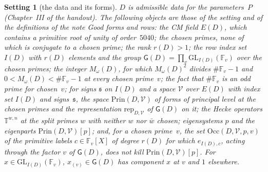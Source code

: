 \documentclass[11pt,a4paper]{article}
\newcommand{\F}{\mathbb{F}}
\newcommand{\m}[1]{\mbox{$#1$}}        %
\theoremstyle{plainx}
\theoremstyle{uprightx}
\newtheorem{setting}[theorem]{Setting}          %
\newcommand{\cV}{{\mathcal V}}
\newcommand{\fs}{{\mathfrak s}}
\newcommand{\GL}{\mathrm{GL}}
\begin{document}
\begin{setting}[the data and its forms]\label{s:data}
$D$ is admissible data for the parameters~$P$ (Chapter~III of the handout). The following objects are those of
the setting and of the definitions of the note \emph{Good forms and rows}: the CM field $E(D)$, which
contains a primitive root of unity of order~$5040$; the chosen primes, none of which is conjugate to a chosen
prime; the rank \m{r(D)>1}; the row index set $I(D)$ with $r(D)$ elements and the group
\m{\mathsf G(D)=\prod_v\GL_{I(D)}(\F_v)} over the chosen primes; the integer \m{M_\omega(D)}, for which
\m{M_\omega(D)^2} divides \m{\#\F_v-1} and \m{0<M_\omega(D)<\#\F_v-1} at every chosen prime~$v$; the fact that
$\#\F_v$ is an odd prime for chosen~$v$; for signs $\fs$ on $I(D)$ and a space $\cV$ over $E(D)$ with index set
$I(D)$ and signs~$\fs$, the space \m{\mathrm{Prin}(D,\cV)} of forms of principal level at the chosen primes and the
representation \m{\mathrm{rep}_{D,\cV}} of \m{\mathsf G(D)} on it; the Hecke operators \m{\mathbb T^{w,n}} at the
split primes $w$ with neither $w$ nor $\bar w$ chosen; eigensystems $p$ and the eigenparts
\m{\mathrm{Prin}(D,\cV)[p]}; and, for a chosen prime~$v$, the set \m{\mathrm{Occ}(D,\cV,p,v)} of the primitive
labels \m{c\in\F_v[X]} of degree $r(D)$ for which \m{e_{I(D),c}}, acting through the factor $v$ of
\m{\mathsf G(D)}, does not kill \m{\mathrm{Prin}(D,\cV)[p]}. For \m{x\in\GL_{I(D)}(\F_v)}, \m{x_{(v)}\in\mathsf G(D)}
has component $x$ at $v$ and $1$ elsewhere.
\end{setting}
\end{document}
